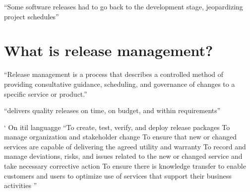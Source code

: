 ``Some software releases  had  to go back to the development stage, jeopardizing project schedules''  \citep{WinklerKettunen2018}
 
 
 
 
 \section{What is release management?}
 
 
 ``Release management is a process that describes a controlled method of providing
consultative guidance, scheduling, and governance of changes to a specific service
or product.''  \citep{Howard2016}


``delivers quality releases on time, on budget, and within requirements'' \citep{Howard2016}
 
 
 `
On itil languagge 
    ``To create, test, verify, and deploy release packages
    To manage organization and stakeholder change
    To ensure that new or changed services are capable of delivering the agreed utility and warranty
    To record and manage deviations, risks, and issues related to the new or changed service and take necessary corrective action
    To ensure there is knowledge transfer to enable customers and users to optimize use of services that support their business activities
''


